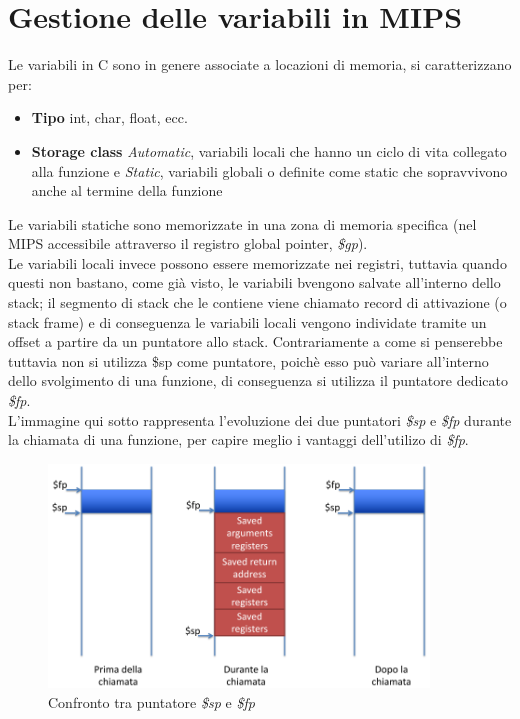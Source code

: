 \documentclass[class=book, crop=false]{standalone}
\begin{document}
\section{Gestione delle variabili in MIPS}
Le variabili in C sono in genere associate a locazioni di memoria, si caratterizzano per:
\begin{itemize}[noitemsep]
	\item \textbf{Tipo} int, char, float, ecc.
	\item \textbf{Storage class} \textit{Automatic}, variabili locali che hanno un ciclo di vita collegato alla funzione e \textit{Static}, variabili globali o definite come static che sopravvivono anche al termine della funzione
\end{itemize}
Le variabili statiche sono memorizzate in una zona di memoria specifica (nel MIPS accessibile attraverso il registro global pointer, \emph{\$gp}).\\
Le variabili locali invece possono essere memorizzate nei registri, tuttavia quando questi non bastano, come già visto, le variabili bvengono salvate all'interno dello stack; il segmento di stack che le contiene viene chiamato record di attivazione (o stack frame) e di conseguenza le variabili locali vengono individate tramite un offset a partire da un puntatore allo stack.
Contrariamente a come si penserebbe tuttavia non si utilizza \$sp come puntatore, poichè esso può variare all'interno dello svolgimento di una funzione, di conseguenza si utilizza il puntatore dedicato \emph{\$fp}.\\
L'immagine qui sotto rappresenta l'evoluzione dei due puntatori \emph{\$sp} e \emph{\$fp} durante la chiamata di una funzione, per capire meglio i vantaggi dell'utilizo di \emph{\$fp}.
\begin{figure}[H]
	\centering
	\includegraphics[width=0.9\textwidth,keepaspectratio]{sp-vs-fp}
	\caption{Confronto tra puntatore \emph{\$sp} e \emph{\$fp}}
\end{figure}
\end{document}
